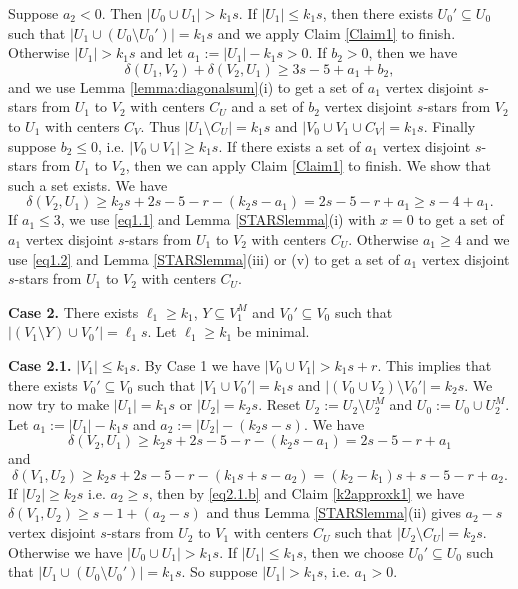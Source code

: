 \documentclass[oneside,12pt]{memoir}
\begin{document}
Suppose $a_2<0$. Then $|U_0\cup U_1|>k_1s$.  If $|U_1|\leq k_1s$, then there exists $U_0'\subseteq U_0$ such that $|U_1\cup (U_0\setminus U_0')|=k_1s$ and we apply Claim \ref{Claim1} to finish.  Otherwise $|U_1|>k_1s$ and let $a_1:=|U_1|-k_1s>0$.  If $b_2>0$, then we have $$\delta(U_1, V_2)+\delta(V_2, U_1)\geq 3s-5+a_1+b_2,$$ and we use Lemma \ref{lemma:diagonalsum}(i) to get a set of $a_1$ vertex disjoint $s$-stars from $U_1$ to $V_2$ with centers $C_U$ and a set of $b_2$ vertex disjoint $s$-stars from $V_2$ to $U_1$ with centers $C_V$.  Thus $|U_1\setminus C_U|=k_1s$ and $|V_0\cup V_1\cup C_V|=k_1s$.  Finally suppose $b_2\leq 0$, i.e. $|V_0\cup V_1|\geq k_1s$.  If there exists a set of $a_1$ vertex disjoint $s$-stars from $U_1$ to $V_2$, then we can apply Claim \ref{Claim1} to finish.  We show that such a set exists.  We have 
\begin{equation} 
\label{eq1.2} \delta(V_2, U_1)\geq k_2s+2s-5-r-(k_2s-a_1)=2s-5-r+a_1\geq s-4+a_1. 
\end{equation} 
If $a_1\leq 3$, we use \eqref{eq1.1} and Lemma \ref{STARSlemma}(i) with $x=0$ to get a set of $a_1$ vertex disjoint $s$-stars from $U_1$ to $V_2$ with centers $C_U$.  Otherwise $a_1\geq 4$ and we use \eqref{eq1.2} and Lemma \ref{STARSlemma}(iii) or (v) to get a set of $a_1$ vertex disjoint $s$-stars from $U_1$ to $V_2$ with centers $C_U$.

\noindent
\textbf{Case 2.} There exists $\ell_1\geq k_1$, $Y\subseteq V_1^M$ and $V_0'\subseteq V_0$ such that $|(V_1\setminus Y)\cup V_0'|=\ell_1s$.  Let $\ell_1\geq k_1$ be minimal.

\textbf{Case 2.1.}
$|V_1|\leq k_1s$.  By Case 1 we have $|V_0\cup V_1|>k_1s+r$.  This implies that there exists $V_0'\subseteq V_0$ such that $|V_1\cup V_0'|=k_1s$ and $|(V_0\cup V_2)\setminus V_0'|=k_2s$.  We now try to make $|U_1|=k_1s$ or $|U_2|=k_2s$.  Reset $U_2:=U_2\setminus U_2^M$ and $U_0:=U_0\cup U_2^M$.  Let $a_1:=|U_1|-k_1s$ and $a_2:=|U_2|-(k_2s-s)$. We have 
\begin{equation}\label{eq2.1.a}
\delta(V_2, U_1)\geq k_2s+2s-5-r-(k_2s-a_1)=2s-5-r+a_1
\end{equation}
and
\begin{equation}\label{eq2.1.b}
\delta(V_1, U_2)\geq k_2s+2s-5-r-(k_1s+s-a_2)=(k_2-k_1)s+s-5-r+a_2.
\end{equation}
If $|U_2|\geq k_2s$ i.e. $a_2\geq s$, then by \eqref{eq2.1.b} and Claim \ref{k2approxk1} we have $\delta(V_1, U_2)\geq s-1+(a_2-s)$ and thus Lemma \ref{STARSlemma}(ii) gives $a_2-s$ vertex disjoint $s$-stars from $U_2$ to $V_1$ with centers $C_U$ such that $|U_2\setminus C_U|=k_2s$.  Otherwise we have $|U_0\cup U_1|>k_1s$.  If $|U_1|\leq k_1s$, then we choose $U_0'\subseteq U_0$ such that $|U_1\cup (U_0\setminus U_0')|=k_1s$.  So suppose $|U_1|>k_1s$, i.e. $a_1>0$.  
\end{document}
